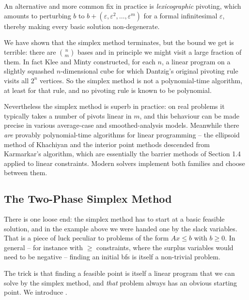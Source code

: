 \documentclass[a4paper]{scrartcl}
\begin{document}
An alternative and more common fix in practice is \emph{lexicographic} pivoting, which amounts to perturbing $b$ to $b + (\varepsilon, \varepsilon^2, \dots, \varepsilon^m)$ for a formal infinitesimal $\varepsilon$, thereby making every basic solution non-degenerate.

\begin{remark}
    We have shown that the simplex method terminates, but the bound we get is terrible: there are $\binom nm$ bases and in principle we might visit a large fraction of them. In fact Klee and Minty constructed, for each $n$, a linear program on a slightly squashed $n$-dimensional cube for which Dantzig's original pivoting rule visits all $2^n$ vertices. So the simplex method is not a polynomial-time algorithm, at least for that rule, and no pivoting rule is known to be polynomial.

    Nevertheless the simplex method is superb in practice: on real problems it typically takes a number of pivots linear in $m$, and this behaviour can be made precise in various average-case and smoothed-analysis models. Meanwhile there \emph{are} provably polynomial-time algorithms for linear programming -- the ellipsoid method of Khachiyan and the interior point methods descended from Karmarkar's algorithm, which are essentially the barrier methods of Section 1.4 applied to linear constraints. Modern solvers implement both families and choose between them.
\end{remark}

\subsection{The Two-Phase Simplex Method}

There is one loose end: the simplex method has to start at a basic feasible solution, and in the example above we were handed one by the slack variables. That is a piece of luck peculiar to problems of the form $Ax \leq b$ with $b \geq 0$. In general -- for instance with $\geq$ constraints, where the surplus variables would need to be negative -- finding an initial bfs is itself a non-trivial problem.

The trick is that finding a feasible point is itself a linear program that we can solve by the simplex method, and \emph{that} problem always has an obvious starting point. We introduce .
\end{document}

